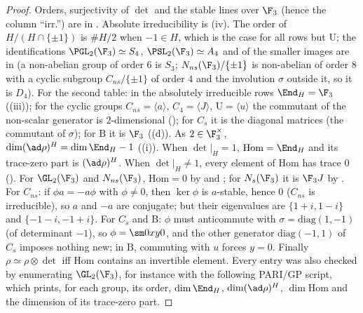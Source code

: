 \begin{proof}
Orders, surjectivity of $\det$ and the stable lines over $\F_3$ (hence the column ``irr.'') are in . Absolute irreducibility is
(iv). The order of $H/(H\cap\{\pm1\})$ is $\#H/2$ when $-1\in H$, which is the case for all rows but $\mathrm U$; the
identifications $\PGL_2(\F_3)\simeq S_4$, $\PSL_2(\F_3)\simeq A_4$ and of the smaller images are in  (a non-abelian group of order $6$ is $S_3$; $N_{ns}(\F_3)/\{\pm1\}$ is
non-abelian of order $8$ with a cyclic subgroup $C_{ns}/\{\pm1\}$ of order $4$ and the involution $\sigma$ outside it, so it is $D_4$).
For the second table: in the absolutely irreducible rows $\End_H=\F_3$ ((iii)); for the cyclic groups $C_{ns}=\langle a\rangle$,
$C_4=\langle J\rangle$, $\mathrm U=\langle u\rangle$ the commutant of the non-scalar generator is $2$-dimensional (); for $C_s$ it is the
diagonal matrices (the commutant of $\sigma$); for $\mathrm B$ it is $\F_3$ ((d)). As $2\in\F_3^\times$,
$\dim(\ad\rho)^H=\dim\End_H-1$ ((i)). When $\det|_H=1$, $\mathrm{Hom}=\End_H$ and its trace-zero part is $(\ad\rho)^H$. When $\det|_H\ne1$,
every element of $\mathrm{Hom}$ has trace $0$ (). For $\GL_2(\F_3)$ and $N_{ns}(\F_3)$, $\mathrm{Hom}=0$ by 
and ; for $N_s(\F_3)$ it is $\F_3J$ by . For $C_{ns}$: if $\phi a=-a\phi$ with $\phi\ne0$, then $\ker\phi$ is
$a$-stable, hence $0$ ($C_{ns}$ is irreducible), so $a$ and $-a$ are conjugate; but their eigenvalues are $\{1+i,1-i\}$ and $\{-1-i,-1+i\}$.
For $C_s$ and $\mathrm B$: $\phi$ must anticommute with $\sigma=\mathrm{diag}(1,-1)$ (of determinant $-1$), so $\phi=\sm0xy0$, and the other generator
$\mathrm{diag}(-1,1)$ of $C_s$ imposes nothing new; in $\mathrm B$, commuting with $u$ forces $y=0$. Finally $\rho\simeq\rho\otimes\det$ iff $\mathrm{Hom}$ contains an
invertible element. Every entry was also checked by enumerating $\GL_2(\F_3)$, for instance with the following PARI/GP script, which prints,
for each group, its order, $\dim\End_H$, $\dim(\ad\rho)^H$, $\dim\mathrm{Hom}$ and the dimension of its trace-zero part.
\end{proof}

